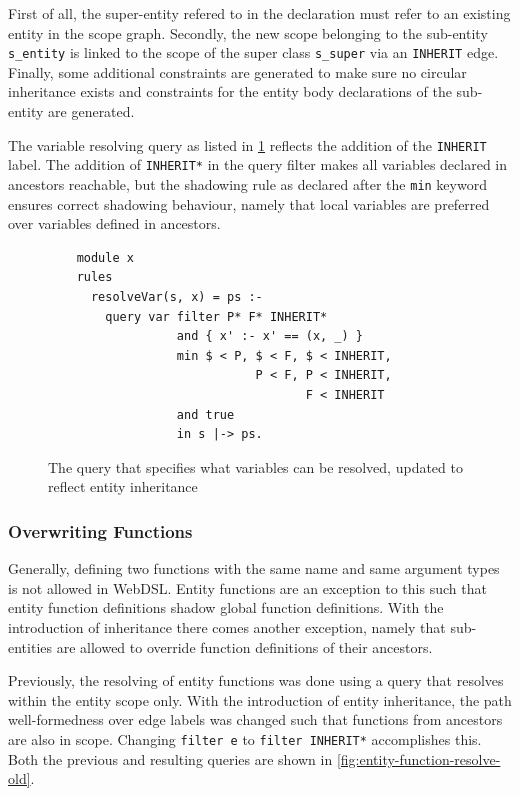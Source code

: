       First of all, the super-entity refered to in the declaration must refer to an existing entity in the scope graph. Secondly, the new scope belonging to the sub-entity \texttt{s\_entity} is linked to the scope of the super class \texttt{s\_super} via an \texttt{INHERIT} edge. Finally, some additional constraints are generated to make sure no circular inheritance exists and constraints for the entity body declarations of the sub-entity are generated.

      The variable resolving query as listed in \cref{fig:var-resolve-query-inheritance} reflects the addition of the \texttt{INHERIT} label. The addition of \texttt{INHERIT*} in the query filter makes all variables declared in ancestors reachable, but the shadowing rule as declared after the \texttt{min} keyword ensures correct shadowing behaviour, namely that local variables are preferred over variables defined in ancestors.

      \begin{figure}
        \begin{verbatim}
    module x
    rules
      resolveVar(s, x) = ps :-
        query var filter P* F* INHERIT*
                  and { x' :- x' == (x, _) }
                  min $ < P, $ < F, $ < INHERIT,
                             P < F, P < INHERIT,
                                    F < INHERIT
                  and true
                  in s |-> ps.
        \end{verbatim}
        \caption{\label{fig:var-resolve-query-inheritance}The query that specifies what variables can be resolved, updated to reflect entity inheritance}
      \end{figure}

    \subsubsection{Overwriting Functions}

      Generally, defining two functions with the same name and same argument types is not allowed in WebDSL. Entity functions are an exception to this such that entity function definitions shadow global function definitions. With the introduction of inheritance there comes another exception, namely that sub-entities are allowed to override function definitions of their ancestors.

      Previously, the resolving of entity functions was done using a query that resolves within the entity scope only. With the introduction of entity inheritance, the path well-formedness over edge labels was changed such that functions from ancestors are also in scope. Changing \texttt{filter e} to \texttt{filter INHERIT*} accomplishes this. Both the previous and resulting queries are shown in \cref{fig:entity-function-resolve-old}.


